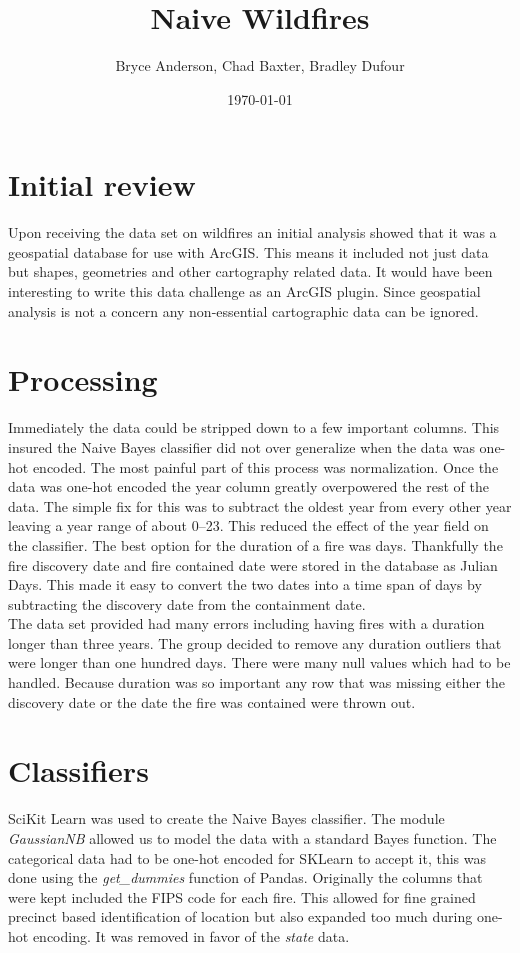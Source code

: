 \documentclass[12pt letter]{article}
\title{Naive Wildfires}
\author{Bryce Anderson, Chad Baxter, Bradley Dufour}
\date{\today}
\begin{document}
\maketitle
\clearpage

\section{Initial review}
Upon receiving the data set on wildfires an initial analysis showed that it was a geospatial database for use with ArcGIS. This means it included not just data but shapes, geometries and other cartography related data. It would have been interesting to write this data challenge as an ArcGIS plugin. Since geospatial analysis is not a concern any non-essential cartographic data can be ignored.\\

\section{Processing}
Immediately the data could be stripped down to a few important columns. This insured the Naive Bayes classifier did not over generalize when the data was one-hot encoded. The most painful part of this process was normalization. Once the data was one-hot encoded the year column greatly overpowered the rest of the data. The simple fix for this was to subtract the oldest year from every other year leaving a year range of about 0--23. This reduced the effect of the year field on the classifier. The best option for the duration of a fire was days. Thankfully the fire discovery date and fire contained date were stored in the database as Julian Days. This made it easy to convert the two dates into a time span of days by subtracting the discovery date from the containment date.\\

The data set provided had many errors including having fires with a duration longer than three years. The group decided to remove any duration outliers that were longer than one hundred days. There were many null values which had to be handled. Because duration was so important any row that was missing either the discovery date or the date the fire was contained were thrown out.\\

\section{Classifiers}
SciKit Learn was used to create the Naive Bayes classifier. The module \textit{GaussianNB} allowed us to model the data with a standard Bayes function. The categorical data had to be one-hot encoded for SKLearn to accept it, this was done using the \textit{get\_dummies} function of Pandas. Originally the columns that were kept included the FIPS code for each fire. This allowed for fine grained precinct based identification of location but also expanded too much during one-hot encoding. It was removed in favor of the \textit{state} data.\\
\end{document}
